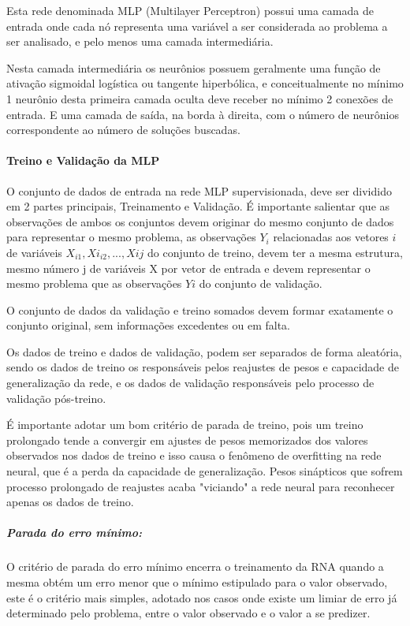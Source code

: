 \documentclass[	12pt, Times, openright, twoside, a4paper, english, brazil]{abntex2}
\begin{document}
  	       Esta rede denominada MLP (Multilayer Perceptron) possui uma camada de entrada onde cada nó representa uma variável a ser considerada ao problema a ser analisado, e pelo menos uma camada intermediária.
  	      
  	       Nesta camada intermediária os neurônios possuem geralmente uma função de ativação sigmoidal logística ou tangente hiperbólica, e conceitualmente no mínimo 1 neurônio desta primeira camada oculta deve receber no mínimo 2 conexões de entrada. E uma camada de saída, na borda à direita, com o número de neurônios correspondente ao número de soluções buscadas. 
  	       
            \paragraph*{Treino e Validação da MLP}
            	O conjunto de dados de entrada na rede MLP supervisionada, deve ser dividido em 2 partes principais, Treinamento e Validação. É importante salientar que as observações de ambos os conjuntos devem originar do mesmo conjunto de dados para representar o mesmo problema, as observações $Y_i$ relacionadas aos vetores $i$ de variáveis $X_{i1},Xi_{i2},...,X{ij}$ do conjunto de treino, devem ter a mesma estrutura, mesmo número j de variáveis X por vetor de entrada e devem representar o mesmo problema que as observações $Yi$ do conjunto de validação.
            	
            	O conjunto de dados da validação e treino somados devem formar exatamente o conjunto original, sem informações excedentes ou em falta.
            	
            	Os dados de treino e dados de validação, podem ser separados de forma aleatória, sendo os dados de treino os responsáveis pelos reajustes de pesos e capacidade de generalização da rede, e os dados de validação responsáveis pelo processo de validação pós-treino.
            	
            	É importante adotar um bom critério de parada de treino, pois um treino prolongado tende a convergir em ajustes de pesos memorizados dos valores observados nos dados de treino e isso causa o fenômeno de overfitting na rede neural, que é a perda da capacidade de generalização. Pesos sinápticos que sofrem processo prolongado de reajustes acaba "viciando" a rede neural para reconhecer apenas os dados de treino.
            	
            	\subparagraph{ Parada do erro mínimo:}
            	O critério de parada do erro mínimo encerra o treinamento da RNA quando a mesma obtém um erro menor que o mínimo estipulado para o valor observado, este é o critério mais simples, adotado nos casos onde existe um limiar de erro já determinado pelo problema, entre o valor observado e o valor a se predizer.
            	
\end{document}
